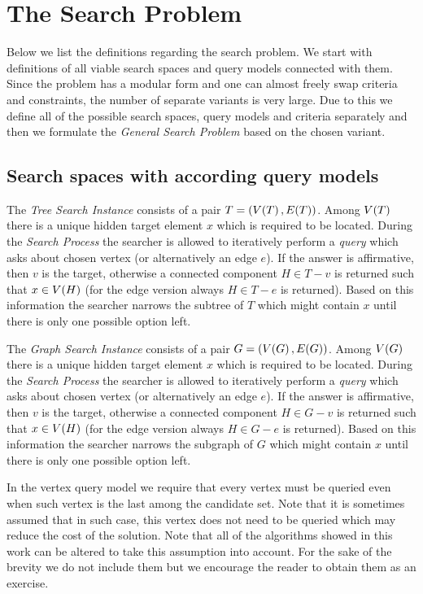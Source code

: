 \section{The Search Problem}

Below we list the definitions regarding the search problem. We start with definitions of all viable search spaces and query models connected with them. Since the problem has a modular form and one can almost freely swap criteria and constraints, the number of separate variants is very large. Due to this we define all of the possible search spaces, query models and criteria separately and then we formulate the \textit{General Search Problem} based on the chosen variant.

\subsection{Search spaces with according query models}

The \textit{Tree Search Instance} consists of a pair $T=\mathopen{}\left( V\mathopen{}\left( T \right),E\mathopen{}\left( T \right) \right)$. Among $V\mathopen{}\left( T \right)$ there is a unique hidden target element $x$ which is required
to be located. During the \textit{Search Process} the searcher is allowed to iteratively perform a \textit{query} which asks about chosen vertex (or alternatively an edge $e$). If the answer is affirmative, then $v$ is the target, otherwise a connected component $H\in T-v$ is returned such that $x\in V\mathopen{}\left( H \right)$ (for the edge version always $H\in T-e$ is returned). Based on this information the searcher narrows the subtree of $T$ which might contain $x$ until there is only one possible option left.

The \textit{Graph Search Instance} consists of a pair $G=\mathopen{}\left( V\mathopen{}\left( G \right),E\mathopen{}\left( G \right) \right)$. Among $V\mathopen{}\left( G \right)$ there is a unique hidden target element $x$ which is required
to be located. During the \textit{Search Process} the searcher is allowed to iteratively perform a \textit{query} which asks about chosen vertex (or alternatively an edge $e$). If the answer is affirmative, then $v$ is the target, otherwise a connected component $H\in G-v$ is returned such that $x\in V\mathopen{}\left( H \right)$ (for the edge version always $H\in G-e$ is returned). Based on this information the searcher narrows the subgraph of $G$ which might contain $x$ until there is only one possible option left. 

\begin{remark}
    In the vertex query model we require that every vertex must be queried even when such vertex is the last among the candidate set. Note that it is sometimes assumed that in such case, this vertex does not need to be queried which may reduce the cost of the solution. Note that all of the algorithms showed in this work can be altered to take this assumption into account. For the sake of the brevity we do not include them but we encourage the reader to obtain them as an exercise.
\end{remark} 


